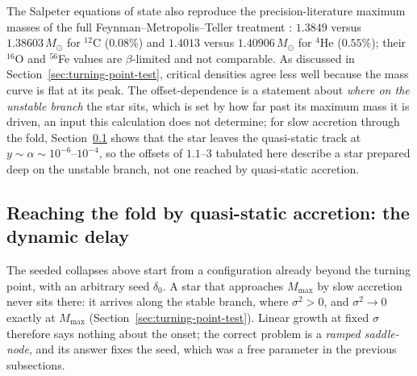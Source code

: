 \documentclass[11pt]{article}
\begin{document}
The Salpeter equations of state also reproduce the precision-literature maximum masses of the full Feynman--Metropolis--Teller treatment \citep[Table~III]{RotondoRRX2011}: $1.3849$ versus $1.38603\,M_\odot$ for $^{12}$C ($0.08\%$) and $1.4013$ versus $1.40906\,M_\odot$ for $^{4}$He ($0.55\%$); their $^{16}$O and $^{56}$Fe values are $\beta$-limited and not comparable. As discussed in Section~\ref{sec:turning-point-test}, critical densities agree less well because the mass curve is flat at its peak. The offset-dependence is a statement about \emph{where on the unstable branch} the star sits, which is set by how far past its maximum mass it is driven, an input this calculation does not determine; for slow accretion through the fold, Section~\ref{sec:fold} shows that the star leaves the quasi-static track at $y\sim\alpha\sim10^{-6}$--$10^{-4}$, so the offsets of $1.1$--$3$ tabulated here describe a star prepared deep on the unstable branch, not one reached by quasi-static accretion.

\subsection{Reaching the fold by quasi-static accretion: the dynamic delay}
\label{sec:fold}

The seeded collapses above start from a configuration already beyond the turning point, with an arbitrary seed $\delta_0$. A star that approaches $M_{\max}$ by slow accretion never sits there: it arrives along the stable branch, where $\sigma^2>0$, and $\sigma^2\to0$ exactly at $M_{\max}$ (Section~\ref{sec:turning-point-test}). Linear growth at fixed $\sigma$ therefore says nothing about the onset; the correct problem is a \emph{ramped saddle-node}, and its answer fixes the seed, which was a free parameter in the previous subsections.
\end{document}

